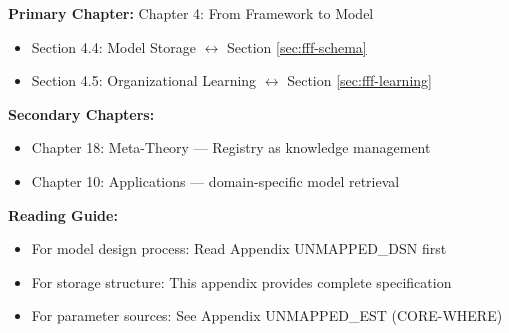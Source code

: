 %
%

%
%
%
%

\begin{tcolorbox}[colback=purple!5!white, colframe=purple!75!black,
    title=Chapter Linkage]

\textbf{Primary Chapter:} Chapter 4: From Framework to Model
\begin{itemize}[nosep]
\item Section 4.4: Model Storage $\leftrightarrow$ Section \ref{sec:fff-schema}
\item Section 4.5: Organizational Learning $\leftrightarrow$ Section \ref{sec:fff-learning}
\end{itemize}

\textbf{Secondary Chapters:}
\begin{itemize}[nosep]
\item Chapter 18: Meta-Theory --- Registry as knowledge management
\item Chapter 10: Applications --- domain-specific model retrieval
\end{itemize}

\textbf{Reading Guide:}
\begin{itemize}[nosep]
\item For model design process: Read Appendix UNMAPPED_DSN first
\item For storage structure: This appendix provides complete specification
\item For parameter sources: See Appendix UNMAPPED_EST (CORE-WHERE)
\end{itemize}

\end{tcolorbox}

